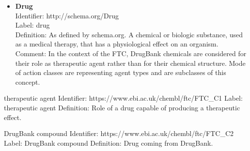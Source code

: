 \documentclass{bioinfo}
\begin{document}
\begin{itemize}
\item \textbf{Drug} \\
Identifier: http://schema.org/Drug \\
Label: drug \\
Definition: As defined by schema.org. A chemical or biologic substance, used as a medical therapy, that has a 
physiological effect on an organism.
Comment: In the context of the FTC, DrugBank chemicals are considered for their role as therapeutic agent 
rather than for their chemical structure. Mode of action classes are representing agent types and are subclasses of this concept.
\end{itemize}

therapeutic agent
Identifier: https://www.ebi.ac.uk/chembl/ftc/FTC_C1
Label: therapeutic agent
Definition: Role of a drug capable of producing a therapeutic effect.

DrugBank compound
Identifier: https://www.ebi.ac.uk/chembl/ftc/FTC_C2
Label: DrugBank compound
Definition: Drug coming from DrugBank.
\end{document}
